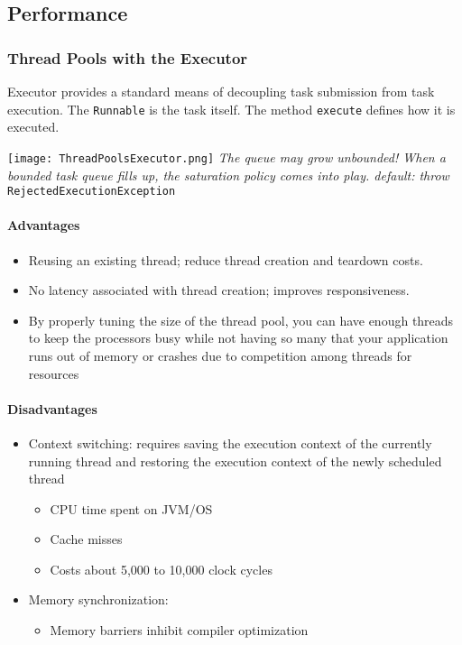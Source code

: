 \documentclass[a4paper]{article}
\begin{document}
\subsection{Performance}
\subsubsection{Thread Pools with the Executor}
Executor provides a standard means of decoupling task submission from task execution. The \texttt{Runnable} is the task itself. The method \texttt{execute} defines how it is executed.

\texttt{[image: ThreadPoolsExecutor.png]}
\noindent
\textit{The queue may grow unbounded! When a bounded task queue fills up, the saturation policy comes into play. default: throw }\texttt{RejectedExecutionException}
\paragraph{Advantages}
\begin{itemize}
	\item Reusing an existing thread; reduce thread creation and teardown costs.
	\item No latency associated with thread creation; improves responsiveness.
	\item By properly tuning the size of the thread pool, you can have enough threads to keep the processors busy while not having so many that your application runs out of memory or crashes due to competition among threads for resources
\end{itemize}
\paragraph{Disadvantages}
\begin{itemize}
	\item Context switching: requires saving the execution context of the currently running thread and restoring the execution context of the newly scheduled thread
	\begin{itemize}[label=$\circ$]
		\item CPU time spent on JVM/OS
		\item Cache misses
		\item Costs about 5,000 to 10,000 clock cycles
	\end{itemize}
	\item Memory synchronization:
	\begin{itemize}[label=$\circ$]
		\item Memory barriers inhibit compiler optimization
	\end{itemize}
\end{itemize}
\end{document}
